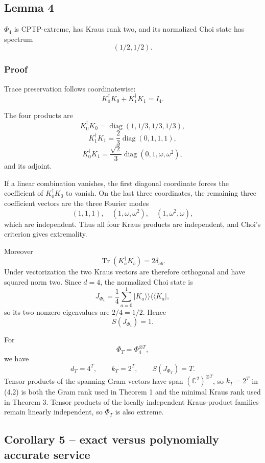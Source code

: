 \documentclass[11pt,a4paper]{article}
\numberwithin{equation}{section}
\begin{document}
\subsection*{Lemma 4}\label{lemma-4}

\(\Phi_4\) is CPTP-extreme, has Kraus rank two, and its normalized Choi
state has spectrum \[
(1/2,1/2).
\]

\subsubsection{Proof}\label{proof-3}

Trace preservation follows coordinatewise: \[
K_0^\dagger K_0+K_1^\dagger K_1=I_4.
\]

The four products are \[
K_0^\dagger K_0
=
\operatorname{diag}(1,1/3,1/3,1/3),
\] \[
K_1^\dagger K_1
=
\frac23\operatorname{diag}(0,1,1,1),
\] \[
K_0^\dagger K_1
=
\frac{\sqrt2}{3}
\operatorname{diag}(0,1,\omega,\omega^2),
\] and its adjoint.

If a linear combination vanishes, the first diagonal coordinate forces
the coefficient of \(K_0^\dagger K_0\) to vanish. On the last three
coordinates, the remaining three coefficient vectors are the three
Fourier modes \[
(1,1,1),\quad
(1,\omega,\omega^2),\quad
(1,\omega^2,\omega),
\] which are independent. Thus all four Kraus products are independent,
and Choi's criterion \citep{choi1975} gives extremality.

Moreover \[
\operatorname{Tr}(K_a^\dagger K_b)=2\delta_{ab}.
\] Under vectorization the two Kraus vectors are therefore orthogonal
and have squared norm two. Since \(d=4\), the normalized Choi state is
\[
J_{\Phi_4}
=
\frac14\sum_{a=0}^1
|K_a\rangle\!\rangle
\langle\!\langle K_a|,
\] so its two nonzero eigenvalues are \(2/4=1/2\). Hence \[
S(J_{\Phi_4})=1.
\]

For \[
\Phi_T=\Phi_4^{\otimes T},
\] we have \[
d_T=4^T,\qquad
k_T=2^T,\qquad
S(J_{\Phi_T})=T.
\tag{4.2}
\] Tensor products of the spanning Gram vectors have span
\((\mathbb C^2)^{\otimes T}\), so \(k_T=2^T\) in (4.2) is both the Gram
rank used in Theorem 1 and the minimal Kraus rank used in Theorem 3.
Tensor products of the locally independent Kraus-product families remain
linearly independent, so \(\Phi_T\) is also extreme.

\subsection*{Corollary 5 -- exact versus polynomially accurate
service}\label{corollary-5-exact-versus-polynomially-accurate-service}
\end{document}
